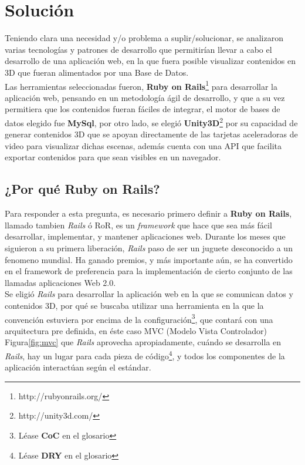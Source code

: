 \chapter{Solución}

Teniendo clara una necesidad y/o problema a suplir/solucionar, se analizaron varias tecnologías y patrones de desarrollo que permitirían llevar a cabo el desarrollo de una aplicación web, en la que fuera posible visualizar contenidos en 3D que fueran alimentados por una Base de Datos.\\

Las herramientas seleccionadas fueron, \textbf{Ruby on Rails}\footnote{http://rubyonrails.org/} para desarrollar la aplicación web, pensando en un metodología ágil de desarrollo, y que a su vez permitiera que los contenidos fueran fáciles de integrar, el motor de bases de datos elegido fue \textbf{MySql}, por otro lado, se elegió \textbf{Unity3D}\footnote{http://unity3d.com/} por su capacidad de generar contenidos 3D que se apoyan directamente de las tarjetas aceleradoras de video para visualizar dichas escenas, además cuenta con una API que facilita exportar contenidos para que sean visibles en un navegador.\\

\section{¿Por qué Ruby on Rails?}

Para responder a esta pregunta, es necesario primero definir a \textbf{Ruby on Rails}, llamado tambien \emph{Rails} ó RoR, es un \emph{framework} que hace que sea más fácil desarrollar, implementar, y mantener aplicaciones web. Durante los meses que siguieron a su primera liberación, \emph{Rails} paso de ser un juguete desconocido a un fenomeno mundial. Ha ganado premios, y más importante aún, se ha convertido en el framework de preferencia para la implementación de cierto conjunto de las llamadas aplicaciones Web 2.0\cite{ror:awdwr}.\\

Se eligió \emph{Rails} para desarrollar la aplicación web en la que se comunican datos y contenidos 3D, por qué se buscaba utilizar una herramienta en la que la convención estuviera por encima de la configuración\footnote{Léase \textbf{CoC} en el glosario}, que contará con una arquitectura pre definida, en éste caso MVC (Modelo Vista Controlador) Figura\ref{fig:mvc} que \emph{Rails} aprovecha apropiadamente, cuándo se desarrolla en \emph{Rails}, hay un lugar para cada pieza de código\footnote{Léase \textbf{DRY} en el glosario}, y todos los componentes de la aplicación interactúan según el estándar.\\

